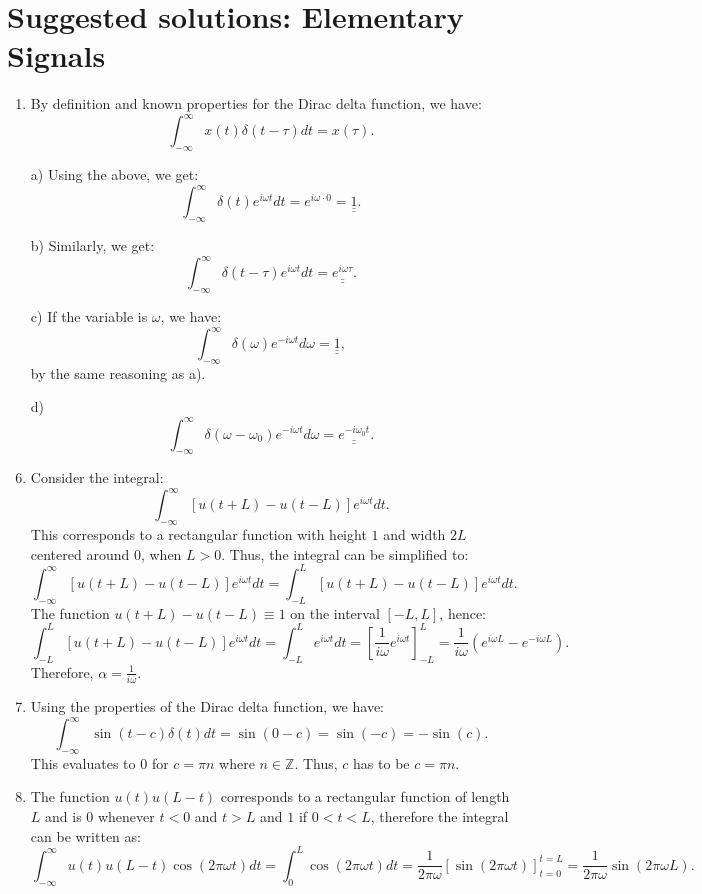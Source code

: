 \newpage
\section{Suggested solutions: Elementary Signals}

\begin{enumerate}
\item By definition and known properties for the Dirac delta function, we have:
$$\int_{-\infty}^{\infty}x(t)\delta(t-\tau)dt=x(\tau).$$

\item[a)]
Using the above, we get:
$$\int_{-\infty}^{\infty}\delta(t)e^{i\omega t}dt=e^{i\omega\cdot 0}=\underline{\underline{1}}.$$

\item[b)]
Similarly, we get:
$$\int_{-\infty}^{\infty}\delta(t-\tau)e^{i\omega t}dt=\underline{\underline{e^{i\omega\tau}}}.$$

\item[c)]
If the variable is $\omega$, we have:
$$\int_{-\infty}^{\infty}\delta(\omega)e^{-i\omega t}d\omega=\underline{\underline{1}},$$
by the same reasoning as a). 

\item[d)]
$$\int_{-\infty}^{\infty}\delta(\omega-\omega_{0})e^{-i\omega t}d\omega=\underline{\underline{e^{-i\omega_{0}t}}}.$$

\item Consider the integral:
$$\int_{-\infty}^{\infty}[u(t+L)-u(t-L)]e^{i\omega t}dt.$$
This corresponds to a rectangular function with height $1$ and width $2L$ centered around $0$, when $L>0$. Thus, the integral can be simplified to:
$$\int_{-\infty}^{\infty}[u(t+L)-u(t-L)]e^{i\omega t}dt=\int_{-L}^{L}[u(t+L)-u(t-L)]e^{i\omega t}dt.$$
The function $u(t+L)-u(t-L)\equiv 1$ on the interval $[-L,L]$, hence:
$$\int_{-L}^{L}[u(t+L)-u(t-L)]e^{i\omega t}dt=\int_{-L}^{L}e^{i\omega t}dt=\left[\frac{1}{i\omega}e^{i\omega t}\right]_{-L}^{L}=\frac{1}{i\omega}(e^{i\omega L}-e^{-i\omega L}).$$
Therefore, $\alpha=\frac{1}{i\omega}$.

\item Using the properties of the Dirac delta function, we have:
$$\int_{-\infty}^{\infty}\sin(t-c)\delta(t)dt=\sin(0-c)=\sin(-c)=-\sin(c).$$
This evaluates to $0$ for $c=\pi n$ where $n\in\mathbb{Z}$. Thus, $c$ has to be $c=\pi n$.

\item The function $u(t)u(L-t)$ corresponds to a rectangular function of length $L$ and 
is $0$ whenever $t<0$ and $t>L$ and $1$ if $0<t<L$, therefore the integral can be written as:
$$\int_{-\infty}^{\infty}u(t)u(L-t)\cos(2\pi\omega t)dt=\int_{0}^{L}\cos(2\pi\omega t)dt=\frac{1}{2\pi\omega}\left[\sin(2\pi\omega t)\right]_{t=0}^{t=L}=\frac{1}{2\pi\omega}\sin(2\pi\omega L).$$

\end{enumerate}
